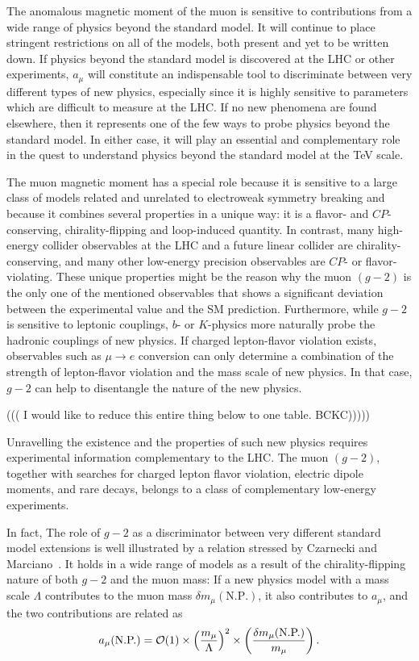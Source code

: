 The anomalous magnetic moment of the muon is sensitive to
contributions from a wide range of physics beyond the standard
model. It  will continue to place stringent restrictions on all of
the models, both present and yet to be written down. If  
physics beyond the standard model is discovered at the LHC 
or other experiments,
$a_\mu$  will constitute an indispensable tool to discriminate
between very different types of new physics, especially since it is
highly sensitive to parameters which are difficult to measure at the
LHC. If no new phenomena are found elsewhere, then it represents one of the few ways
to probe physics beyond the standard model. In either case, it will play an
essential and complementary role in the quest to understand physics
beyond the standard model at the TeV scale. 

The muon magnetic moment has a special role because it is
sensitive to a large class of models related and unrelated to electroweak symmetry breaking and
because it combines several properties in a unique way: it is a
flavor- and $C\!P$-conserving, chirality-flipping and loop-induced 
quantity. In contrast, many high-energy collider observables at the
LHC and a future linear collider are chirality-conserving, and many
other low-energy precision observables are $C\!P$- or
flavor-violating. These unique properties might be the reason why the
muon $(g-2)$ is the only one of the mentioned observables that shows a 
significant deviation between the experimental value and the SM
prediction.  Furthermore, while $g-2$ is sensitive
to leptonic couplings, 
$b$- or $K$-physics more naturally probe the hadronic couplings of new
physics. If charged lepton-flavor violation exists, observables such
as $\mu\to e$ conversion can only determine a combination of the
strength of lepton-flavor violation and the mass scale of new
physics. In that case, $g-2$ can help to disentangle the nature of the
new physics. 


((( I would like to reduce this entire thing below to one table.  BCKC)))))

Unravelling the existence and the properties of such new physics
requires experimental information complementary to the LHC.
The muon $(g-2)$, together
with searches for charged lepton flavor violation, electric dipole
moments, and rare decays, belongs to a class of complementary
low-energy experiments.

In fact, 
The role of $g-2$ as a discriminator between very different standard
model extensions is well illustrated by a relation stressed by
Czarnecki and Marciano~\cite{czmar}. It holds in a wide range of
models as a result of the chirality-flipping nature of both  $g-2$ and
the muon mass: If a new
physics model with a mass scale $\Lambda$
contributes to the muon mass $\delta m_\mu(\mbox{N.P.})$, it also
contributes to $a_\mu$, and the two contributions are related as
\begin{equation}
\label{CzMbound} a_\mu(\mbox{N.P.})={\cal O}(1)\times
\left(\frac{m_\mu}{\Lambda}\right)^2 \times \left(\frac{\delta
m_\mu(\mbox{N.P.})}{m_\mu}\right). 
\end{equation}

